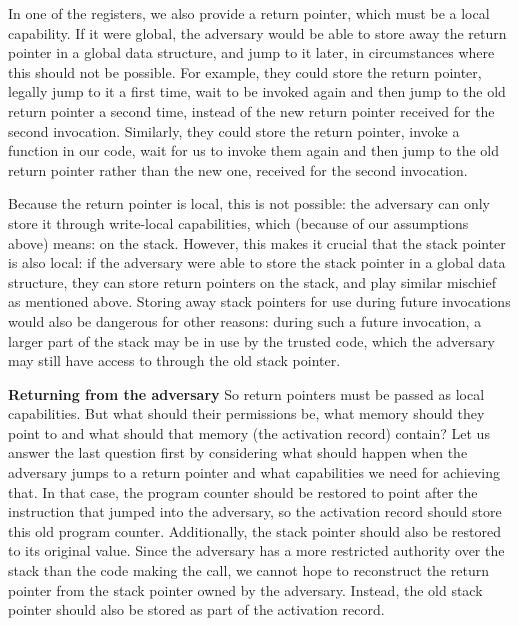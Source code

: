 \documentclass[compsoc,conference,letterpaper,fleqn]{IEEEtran}
\newcommand\lau[1]{{\color{purple} \sf \footnotesize {LS: #1}}\\}
\begin{document}
In one of the registers, we also provide a return pointer, which must be a local
capability. If it were global, the adversary would be able to store away the
return pointer in a global data structure, and jump to it later, in
circumstances where this should not be possible. For example, they could store
the return pointer, legally jump to it a first time, wait to be invoked again
and then jump to the old return pointer a second time, instead of the new return
pointer received for the second invocation. Similarly, they could store the
return pointer, invoke a function in our code, wait for us to invoke them again
and then jump to the old return pointer rather than the new one, received for the
second invocation.
%

Because the return pointer is local, this is not possible: the adversary can
only store it through write-local capabilities, which (because of our
assumptions above) means: on the stack. However, this makes it crucial that the
stack pointer is also local: if the adversary were able to store the stack
pointer in a global data structure, they can store return pointers on the
stack, and play similar mischief as mentioned above. Storing away stack pointers
for use during future invocations would also be dangerous for other reasons:
during such a future invocation, a larger part of the stack may be in use by the
trusted code, which the adversary may still have access to through the old stack
pointer.

\textbf{Returning from the adversary} So return pointers must be passed as local
capabilities. But what should their permissions be, what memory should they
point to and what should that memory (the activation record) contain? Let us
answer the last question first by considering what should happen when the
adversary jumps to a return pointer and what capabilities we need for achieving
that. In that case, the program counter should be restored to point after the
instruction that jumped into the adversary, so the activation record should
store this old program counter. Additionally, the stack pointer should also be
restored to its original value. Since the adversary has a more restricted
authority over the stack than the code making the call, we cannot hope to
reconstruct the return pointer from the stack pointer owned by the adversary.
Instead, the old stack pointer should also be stored as part of the activation
record.
\end{document}
